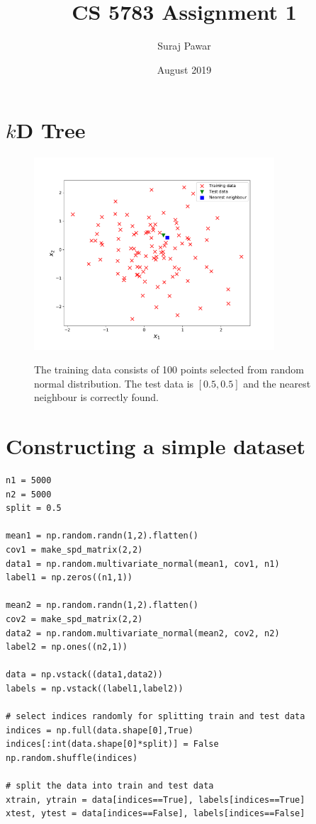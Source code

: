 \documentclass{article}
\title{CS 5783 Assignment 1}
\author{Suraj Pawar}
\date{August 2019}
\begin{document}
\maketitle

\section{$k$D Tree}

\begin{figure}[htbp]
\centering
{\includegraphics[width=0.8\textwidth]{figures/kdtree.pdf}}
\caption{The training data consists of 100 points selected from random normal distribution. The test data is $[0.5,0.5]$ and the nearest neighbour is correctly found.}
\label{fig:kdtree}
\end{figure}

\newpage
\section{Constructing a simple dataset}
\begin{verbatim}
n1 = 5000
n2 = 5000
split = 0.5

mean1 = np.random.randn(1,2).flatten()
cov1 = make_spd_matrix(2,2)
data1 = np.random.multivariate_normal(mean1, cov1, n1)
label1 = np.zeros((n1,1))

mean2 = np.random.randn(1,2).flatten()
cov2 = make_spd_matrix(2,2)
data2 = np.random.multivariate_normal(mean2, cov2, n2)
label2 = np.ones((n2,1))

data = np.vstack((data1,data2))
labels = np.vstack((label1,label2))

# select indices randomly for splitting train and test data
indices = np.full(data.shape[0],True)
indices[:int(data.shape[0]*split)] = False
np.random.shuffle(indices)

# split the data into train and test data
xtrain, ytrain = data[indices==True], labels[indices==True]
xtest, ytest = data[indices==False], labels[indices==False]
\end{verbatim}
\end{document}
